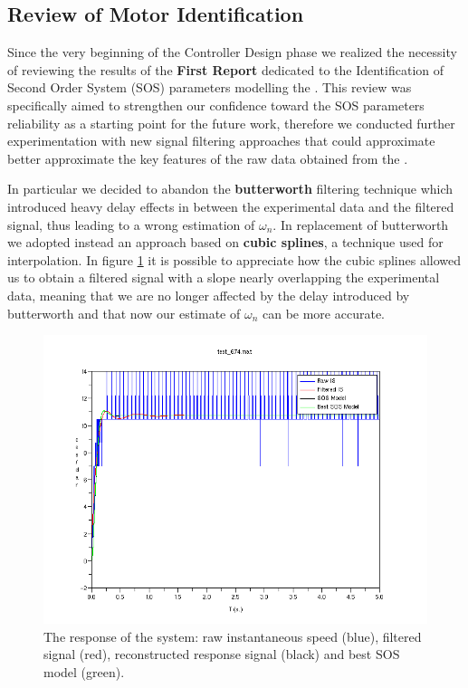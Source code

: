 \subsection{Review of Motor Identification}

Since the very beginning of the Controller Design phase we realized the necessity of reviewing the results of the \textbf{First Report} dedicated to the Identification of Second Order System (SOS) parameters modelling the \LEGOMOTOR{}. This review was specifically aimed to strengthen our confidence toward the SOS parameters reliability as a starting point for the future work, therefore we conducted further experimentation with new signal filtering approaches that could approximate better approximate the key features of the raw data obtained from the \LEGOMOTOR{}.

In particular we decided to abandon the \textbf{butterworth} filtering technique which introduced heavy delay effects in between the experimental data and the filtered signal, thus leading to a wrong estimation of $\omega_n$. In replacement of butterworth we adopted instead an approach based on \textbf{cubic splines}, a technique used for interpolation. In figure \ref{fig:newfiltering} it is possible to appreciate how the cubic splines allowed us to obtain a filtered signal with a slope nearly overlapping the experimental data, meaning that we are no longer affected by the delay introduced by butterworth and that now our estimate of $\omega_n$ can be more accurate.

\begin{figure}[htbp]
\center
  \includegraphics[scale=0.61]{FIGURES_2/power_70_test_24.png}
  \caption[SOSModel]{The response of the system: raw instantaneous speed (blue), filtered signal (red), reconstructed response signal (black) and best SOS model (green).}
  \label{fig:newfiltering}
\end{figure}


